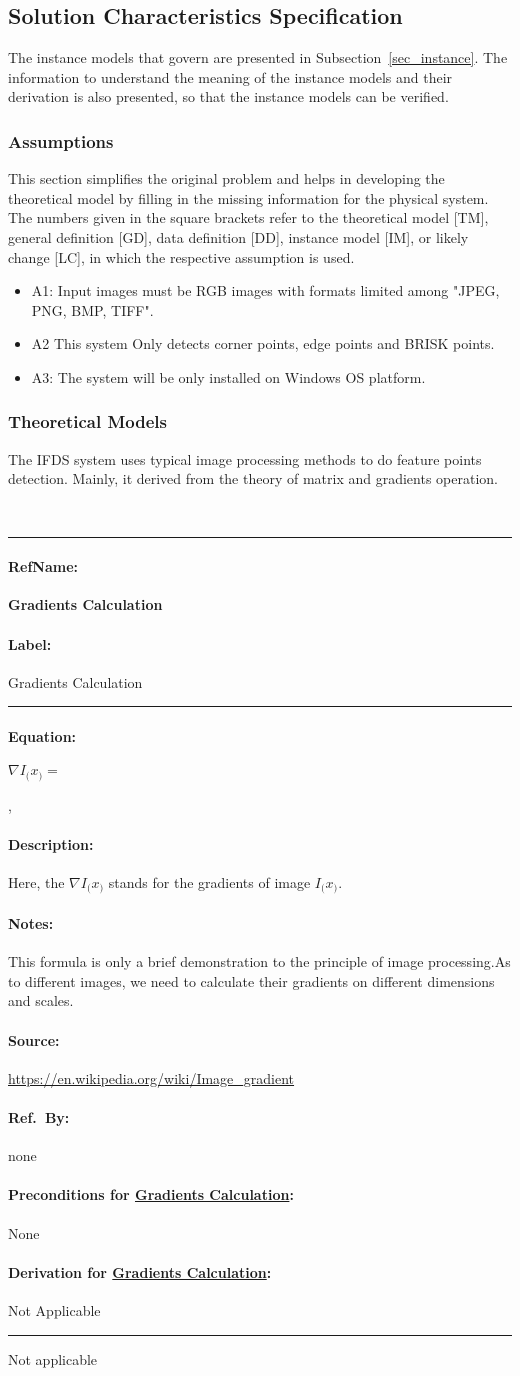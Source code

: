 \documentclass[12pt]{article}
\newcommand{\deftheory}[9][Not Applicable]
{
\newpage
\noindent \rule{\textwidth}{0.5mm}

\paragraph{RefName: } \textbf{#2} \phantomsection 
\label{#2}

\paragraph{Label:} #3

\noindent \rule{\textwidth}{0.5mm}

\paragraph{Equation:}

#4

\paragraph{Description:}

#5

\paragraph{Notes:}

#6

\paragraph{Source:}

#7

\paragraph{Ref.\ By:}

#8

\paragraph{Preconditions for \hyperref[#2]{#2}:}
\label{#2_precond}

#9

\paragraph{Derivation for \hyperref[#2]{#2}:}
\label{#2_deriv}

#1

\noindent \rule{\textwidth}{0.5mm}

}
\begin{document}
\subsection{Solution Characteristics Specification}
The instance models that govern  are presented in
Subsection~\ref{sec_instance}.  The information to understand the meaning of the instance models and their derivation is also presented, so that the instance models can be verified.

\subsubsection{Assumptions} \label{sec_assumpt}

This section simplifies the original problem and helps in developing the
theoretical model by filling in the missing information for the physical system.
The numbers given in the square brackets refer to the theoretical model [TM],
general definition [GD], data definition [DD], instance model [IM], or likely
change [LC], in which the respective assumption is used.

\begin{itemize}

\item A1: Input images must be RGB images with formats limited among "JPEG, PNG, BMP, TIFF".
\item A2  This system Only detects corner points, edge points and BRISK points.
\item A3: The system will be only installed on Windows OS platform.

\end{itemize}

\subsubsection{Theoretical Models}\label{sec_theoretical}
The IFDS system uses typical image processing methods to do feature points detection. Mainly, it derived from the theory of matrix and gradients operation.


~\newline

\noindent
\deftheory
{Gradients Calculation}
{Gradients Calculation}
{
  
$\nabla I_(x_)=$ \begin{bmatrix}
\frac{\partial I_(x_)}{\partial x}, 
\frac{\partial I_(x_)}{\partial y}
\end{bmatrix}
}
{
  Here, the $\nabla I_(x_)$ stands for the gradients of image $I_(x_)$.
}
{
This formula is only a brief demonstration to the principle of image processing.As to different images, we need to calculate their gradients on different dimensions and scales.}
{
  \url{https://en.wikipedia.org/wiki/Image_gradient}
}
{
  none
}
{
None
}
{ Not applicable}
\end{document}
